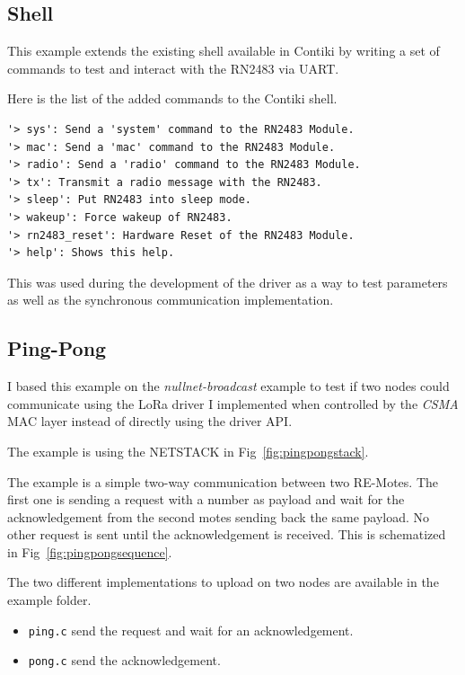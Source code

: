 \subsection{Shell}

This example extends the existing shell available in Contiki by writing a set
of commands to test and interact with the RN2483 via UART\@.

Here is the list of the added commands to the Contiki shell.

\begin{lstlisting}[language=none]
'> sys': Send a 'system' command to the RN2483 Module.
'> mac': Send a 'mac' command to the RN2483 Module.
'> radio': Send a 'radio' command to the RN2483 Module.
'> tx': Transmit a radio message with the RN2483.
'> sleep': Put RN2483 into sleep mode.
'> wakeup': Force wakeup of RN2483.
'> rn2483_reset': Hardware Reset of the RN2483 Module.
'> help': Shows this help.
\end{lstlisting}

This was used during the development of the driver as a way to test parameters
as well as the synchronous communication implementation.

\subsection{Ping-Pong\label{section:pingpong}}

I based this example on the \emph{nullnet-broadcast} example to test if two
nodes could communicate using the LoRa driver I implemented when controlled by
the \emph{CSMA} MAC layer instead of directly using the driver API\@.

The example is using the NETSTACK in Fig~\ref{fig:pingpongstack}.



The example is a simple two-way communication between two RE-Motes. 
The first one is sending a request with a number as
payload and wait for the acknowledgement from the second motes sending back
the same payload. 
No other request is sent until the acknowledgement is received.
This is schematized in Fig~\ref{fig:pingpongsequence}.

The two different implementations to upload on two nodes are available in the
example folder.

\begin{itemize}
  \item \lstinline{ping.c} send the request and wait for an acknowledgement.
  \item \lstinline{pong.c} send the acknowledgement.
\end{itemize}


